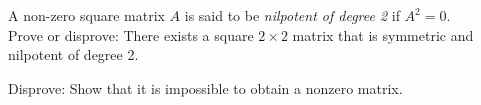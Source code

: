 
\begin{Exercise}[
name={},
title={}, 
difficulty=0,
origin={\cite{YL}}]
A non-zero square matrix $A$ is said to be \emph{nilpotent of degree 2} if $A^2=0$.\\
Prove or disprove: There exists a square $2\times 2$ matrix that is symmetric and nilpotent of degree 2.
\end{Exercise}

\begin{Answer}
Disprove: Show that it is impossible to obtain a nonzero matrix.
\end{Answer}

